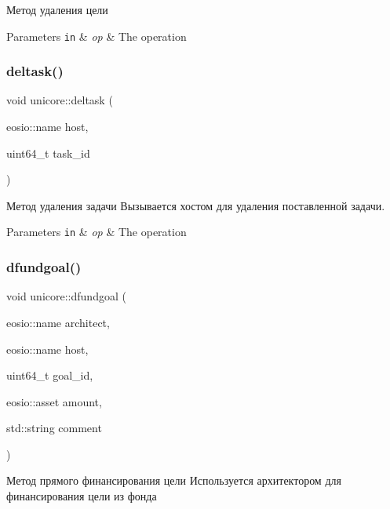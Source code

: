 Метод удаления цели 


\begin{DoxyParams}[1]{Parameters}
\mbox{\tt in}  & {\em op} & The operation \\
\hline
\end{DoxyParams}
\mbox{\label{classunicore_a09d7d2d602069a26875aa1eee250d5f4}} 
\subsubsection{\texorpdfstring{deltask()}{deltask()}}
{\footnotesize\ttfamily void unicore\+::deltask (\begin{DoxyParamCaption}\item[{eosio\+::name}]{host,  }\item[{uint64\+\_\+t}]{task\+\_\+id }\end{DoxyParamCaption})}



Метод удаления задачи Вызывается хостом для удаления поставленной задачи. 


\begin{DoxyParams}[1]{Parameters}
\mbox{\tt in}  & {\em op} & The operation \\
\hline
\end{DoxyParams}
\mbox{\label{classunicore_a969e75dd90699b53b75ab8482cbc49d3}} 
\subsubsection{\texorpdfstring{dfundgoal()}{dfundgoal()}}
{\footnotesize\ttfamily void unicore\+::dfundgoal (\begin{DoxyParamCaption}\item[{eosio\+::name}]{architect,  }\item[{eosio\+::name}]{host,  }\item[{uint64\+\_\+t}]{goal\+\_\+id,  }\item[{eosio\+::asset}]{amount,  }\item[{std\+::string}]{comment }\end{DoxyParamCaption})}



Метод прямого финансирования цели Используется архитектором для финансирования цели из фонда 


